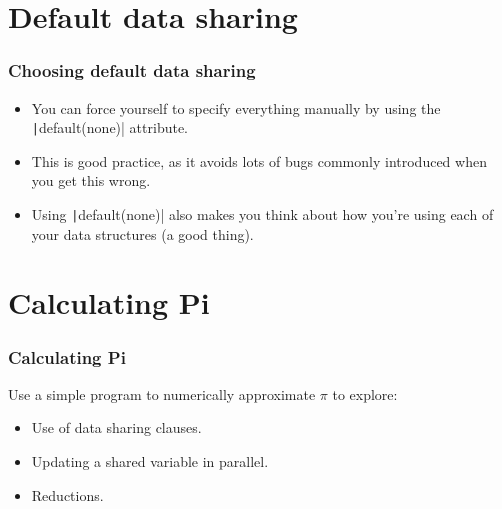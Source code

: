 \documentclass[aspectratio=169]{beamer}
\begin{document}
\section{Default data sharing}
\begin{frame}
\frametitle{Choosing default data sharing}

\begin{itemize}
  \item You can force yourself to specify everything manually by using the \texttt|default(none)| attribute.
  \item This is good practice, as it avoids lots of bugs commonly introduced when you get this wrong. 
  \item Using \texttt|default(none)| also makes you think about how you're using each of your data structures (a good thing).
\end{itemize}

\end{frame}

\section{Calculating Pi}
\begin{frame}
\frametitle{Calculating Pi}
Use a simple program to numerically approximate $\pi$ to explore:
\begin{itemize}
  \item Use of data sharing clauses.
  \item Updating a shared variable in parallel.
  \item Reductions.
\end{itemize}
\end{frame}
\end{document}
